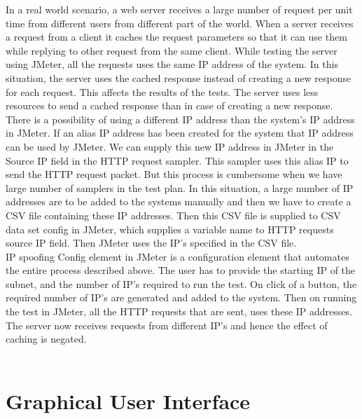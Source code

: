 \documentclass[12pt]{book}
\begin{document}
In a real world scenario, a web server receives a large number of request per unit time from different users from 
different part of the world. When a server receives a request from a client it caches the request parameters so that
it can use them while replying to other request from the same client. While testing the server using JMeter, all the 
requests uses the same IP address of the system. In this situation, the server uses the cached response instead of creating 
a new response for each request. This affects the results of the tests. The server uses less resources to send a cached 
response than in case of creating a new response. \\
There is a possibility of using a different IP address than the system’s IP address in JMeter. 
If an alias IP address has been created for the system that IP address can be used by JMeter. We can supply 
this new IP address in JMeter in the Source IP field in the HTTP request sampler. This sampler uses this alias IP 
to send the HTTP request packet. But this process is cumbersome when we have large number of samplers in the test plan.
In this situation, a large number of IP addresses are to be added to the systems manually and then we have to create a 
CSV file containing these IP addresses. Then this CSV file is supplied to CSV data set config in JMeter, which supplies 
a variable name to HTTP requests source IP field. Then JMeter uses the IP’s specified in the CSV file. \\
IP spoofing Config element in JMeter is a configuration element that automates the entire process described above.
The user has to provide the starting IP of the subnet, and the number of IP’s required to run the test. On click of 
a button, the required number of IP’s are generated and added to the system. Then on running the test in JMeter, all 
the HTTP requests that are sent, uses these IP addresses. The server now receives requests from different IP’s and hence 
the effect of caching is negated.\cite{Comp}\\ \



\chapter{Graphical User Interface}
\end{document}
